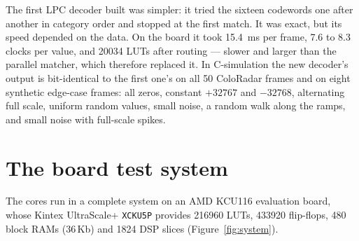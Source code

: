 The first LPC decoder built was simpler: it tried the sixteen codewords one
after another in category order and stopped at the first match. It was exact,
but its speed depended on the data. On the board it took \SI{15.4}{\milli\second}
per frame, 7.6 to 8.3 clocks per value, and \num{20034} LUTs after routing ---
slower and larger than the parallel matcher, which therefore replaced it. In
C-simulation the new decoder's output is bit-identical to the first one's on
all 50 ColoRadar frames and on eight synthetic edge-case frames: all zeros,
constant $+32767$ and $-32768$, alternating full scale, uniform random values,
small noise, a random walk along the ramps, and small noise with full-scale
spikes.

\section{The board test system}
\label{sec:system}

The cores run in a complete system on an AMD KCU116 evaluation board, whose
Kintex UltraScale+ \texttt{XCKU5P} provides \num{216960} LUTs, \num{433920}
flip-flops, 480 block RAMs (36\,Kb) and \num{1824} DSP slices
(Figure~\ref{fig:system}).

